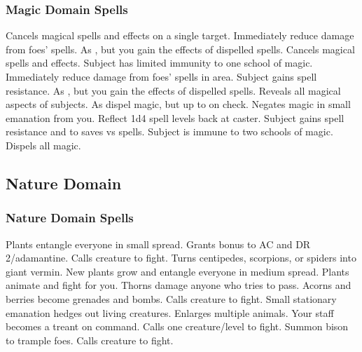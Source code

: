 \subsubsection{Magic Domain Spells}
\begin{spelllist}
   Cancels magical spells and effects on a single target.
   Immediately reduce damage from foes' spells.
  \spellhead[2]{}
   As , but you gain the effects of dispelled spells.
   Cancels magical spells and effects.
   Subject has limited immunity to one school of magic. 
   Immediately reduce damage from foes' spells in area.
   Subject gains spell resistance.
  \spellhead[5]{}
   As , but you gain the effects of dispelled spells.
  \F Reveals all magical aspects of subjects.
   As dispel magic, but up to  on check.
   Negates magic in small emanation from you.
   Reflect 1d4 spell levels back at caster.
   Subject gains spell resistance and  to saves vs spells.
   Subject is immune to two schools of magic.
   Dispels all magic.
  \spellhead[9]{}
\end{spelllist}
\subsection{Nature Domain}

\subsubsection{Nature Domain Spells}
\begin{spelllist}
    \spellhead[1]{}
   Plants entangle everyone in small spread.
   Grants  bonus to AC and DR 2/adamantine.
  \spellhead[2]{}
  \spellhead[3]{}
   Calls creature to fight.
   Turns centipedes, scorpions, or spiders into giant vermin.
   New plants grow and entangle everyone in medium spread.
   Plants animate and fight for you.
   Thorns damage anyone who tries to pass.
   Acorns and berries become grenades and bombs.
   Calls creature to fight.
   Small stationary emanation hedges out living creatures.
   Enlarges multiple animals.
   Your staff becomes a treant on command.
   Calls one creature/level to fight.
   Summon bison to trample foes.
   Calls creature to fight.
\end{spelllist}


